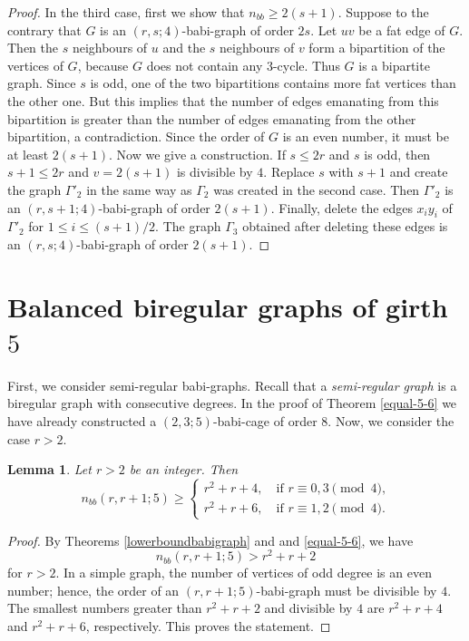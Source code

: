 \documentclass[a4paper,11pt]{article}
\newtheorem{lemma}[theorem]{Lemma}
\begin{document}
\begin{proof}
In the third case, first we show that $n_{bb}\geq 2(s+1)$. Suppose to the contrary that $G$ is an $(r,s;4)$-babi-graph of order $2s$. Let $uv$ be a fat edge of $G$. Then the $s$ neighbours of $u$ and the $s$ neighbours of $v$ form a bipartition of the vertices of $G$, because $G$ does not contain any 3-cycle. Thus $G$ is a bipartite graph. Since $s$ is odd,
one of the two bipartitions contains more fat vertices than the other one. But this implies that the number of edges emanating from this bipartition is greater than the number of edges emanating from the other bipartition, a contradiction. Since the order of $G$ is an even number, it must be at least $2(s+1)$. Now we give a construction.  
If $s\leq 2r$ and $s$ is odd, then $s+1\leq 2r$ and $v=2(s+1)$ is divisible by $4$. Replace $s$ with $s+1$ and create the graph $\Gamma '_2$ in the same way as $\Gamma _2$ was created in the second case.
Then $\Gamma '_2$ is an $(r,s+1;4)$-babi-graph of order $2(s+1)$. Finally, delete the edges $x_iy_i$ of $\Gamma '_2$ for $1\leq i\leq (s+1)/2$. The graph $\Gamma _3$ obtained after deleting these edges is an $(r,s;4)$-babi-graph of order $2(s+1)$. 
\end{proof}


\section{Balanced biregular graphs of girth $5$}\label{girth5}

First, we consider semi-regular babi-graphs. Recall that a {\emph{semi-regular graph}} is a biregular graph with consecutive degrees. In the proof of Theorem \ref{equal-5-6} we have already constructed a 
$(2,3;5)$-babi-cage of order $8$.
Now, we consider the case $r>2$.

\begin{lemma}\label{semireg-5}
Let $r>2$ be an integer. Then 
$$n_{bb}(r,r+1;5)\geq
\begin{cases}
r^2+r+4, \quad\text{if $r\equiv 0,3 \pmod 4$,} \\
r^2+r+6, \quad\text{if $r\equiv 1,2 \pmod 4$.}
\end{cases}$$
\end{lemma}

\begin{proof}
By Theorems \ref{lowerboundbabigraph} and and \ref{equal-5-6}, we have 
$$n_{bb}(r,r+1;5) > r^2+r+2$$
for $r>2$. In a simple graph, the number of vertices of odd degree is an even number; hence, the order of an 
$(r,r+1;5)$-babi-graph must be divisible by $4.$ The smallest numbers greater than $r^2+r+2$ and divisible by $4$ are $r^2+r+4$ and $r^2+r+6$, respectively. This proves the statement.
\end{proof}
\end{document}
